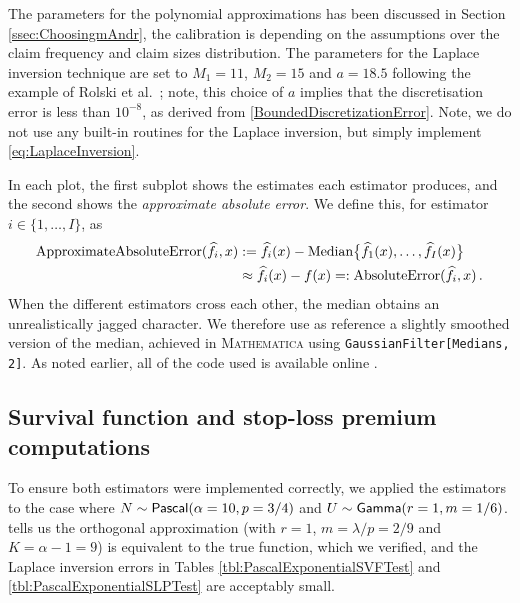 The parameters for the polynomial approximations has been discussed in Section \ref{ssec:ChoosingmAndr}, the calibration is depending on the assumptions over the claim frequency and claim sizes distribution.
The parameters for the Laplace inversion technique are set to $M_1=11$, $M_2=15$ and $a=18.5$ following the example of Rolski et al.\ \cite[Chapter 5, Section 5]{RoScScTe08}; note, this choice of $a$ implies that the discretisation error is less than $10^{-8}$, as derived from \eqref{BoundedDiscretizationError}. Note, we do not use any built-in routines for the Laplace inversion, but simply implement \eqref{eq:LaplaceInversion}.


In each plot, the first subplot shows the estimates each estimator produces, and the second shows the \emph{approximate absolute error}. We define this, for estimator $i \in \{1,\dots,I\}$, as
\begin{align*}
\text{ApproximateAbsoluteError}( \widehat{f}_i, x )
&:= \widehat{f}_i(x)- \text{Median}\big\{ \widehat{f}_1(x),\dots,\widehat{f}_I(x) \big\} \\
&\approx \widehat{f}_i(x)-f(x) =: \text{AbsoluteError}( \widehat{f}_i, x ) \,.
\end{align*}
When the different estimators cross each other, the median obtains an unrealistically jagged character. We therefore use as reference a slightly smoothed version of the median, achieved in \textsc{Mathematica} using \texttt{GaussianFilter[Medians, 2]}. As noted earlier, all of the code used is available online \cite{StoplossCode}.

\newpage
\subsection{Survival function and stop-loss premium computations}

\label{subsec:NumericsSurvivalFunctionStopLoss}

To ensure both estimators were implemented correctly, we applied the estimators to the case where $N\sim\mathsf{Pascal}(\alpha=10,p=3/4)$ and $U\sim\mathsf{Gamma}(r=1,m=1/6)$.  tells us the orthogonal approximation (with $r=1$, $m=\lambda/p=2/9$ and $K = \alpha-1 = 9$) is equivalent to the true function, which we verified, and the Laplace inversion errors in Tables \ref{tbl:PascalExponentialSVFTest} and \ref{tbl:PascalExponentialSLPTest} are acceptably small.

